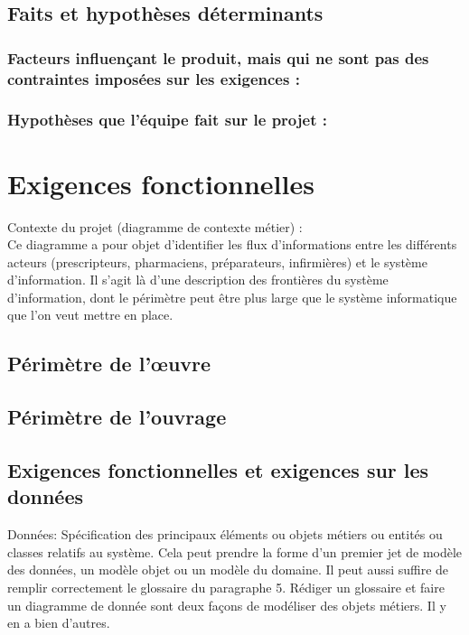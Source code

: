 		\subsection{Faits et hypothèses déterminants}
			\subsubsection{Facteurs influençant le produit, mais qui ne sont pas des contraintes imposées sur les exigences :}
			\subsubsection{Hypothèses que l’équipe fait sur le projet :}
		
	\section{Exigences fonctionnelles}
		{\color{red}
		Contexte du projet (diagramme de contexte métier) :\\	 
		Ce diagramme a pour objet d’identifier les flux d’informations entre les différents acteurs (prescripteurs, pharmaciens, préparateurs, infirmières) et le système d’information.
		Il s’agit là d’une description des frontières du système d’information, dont le périmètre peut être plus large que le système informatique que l’on veut mettre en place.
		}

		\subsection{Périmètre de l'œuvre}
		
		\subsection{Périmètre de l'ouvrage}

		\subsection{Exigences fonctionnelles et exigences sur les données}	
		{\color{red}
		Données: Spécification des principaux éléments ou objets métiers ou entités ou classes relatifs au système. Cela peut prendre la forme d’un premier jet de modèle des données, un modèle objet ou un modèle du domaine. Il peut aussi suffire de remplir correctement le glossaire du paragraphe 5. Rédiger un glossaire et faire un diagramme de donnée sont deux façons de modéliser des objets métiers. Il y en a bien d’autres.\\
		}
	
